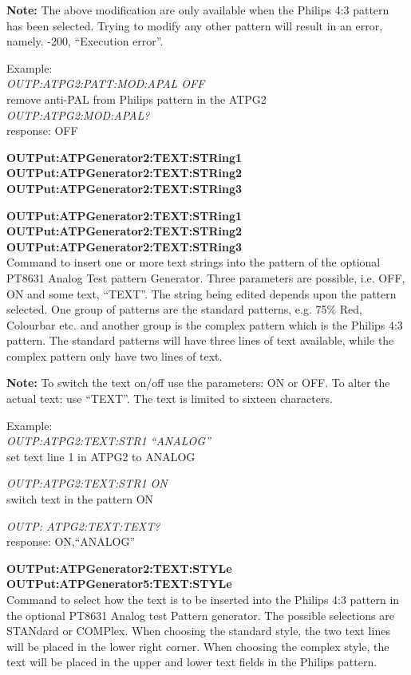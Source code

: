 \textbf{Note:} The above modification are only available when the Philips 4:3 pattern has been selected. Trying to modify any other pattern will result in an error, namely. -200, ``Execution error''.

Example:\\
\textit{OUTP:ATPG2:PATT:MOD:APAL OFF}\\
remove anti-PAL from Philips pattern in the ATPG2\\
\textit{OUTP:ATPG2:MOD:APAL?}\\
response: OFF

\textbf{OUTPut:ATPGenerator2:TEXT:STRing1}\\
\textbf{OUTPut:ATPGenerator2:TEXT:STRing2}\\
\textbf{OUTPut:ATPGenerator2:TEXT:STRing3}

\textbf{OUTPut:ATPGenerator2:TEXT:STRing1}\\
\textbf{OUTPut:ATPGenerator2:TEXT:STRing2}\\
\textbf{OUTPut:ATPGenerator2:TEXT:STRing3}\\
Command to insert one or more text strings into the pattern of the optional PT8631 Analog Test pattern Generator. Three parameters are possible, i.e. OFF, ON and some text, ``TEXT''. The string being edited depends upon the pattern selected. One group of patterns are the
standard patterns, e.g. 75\% Red, Colourbar etc. and another group is the complex pattern which is the Philips 4:3 pattern. The standard patterns will have three lines of text available, while the complex pattern only have two lines of text.

\textbf{Note:} To switch the text on/off use the parameters: ON or OFF. To alter the actual text: use ``TEXT''. The text is limited to sixteen characters. %

Example:\\
\textit{OUTP:ATPG2:TEXT:STR1 ``ANALOG''}\\
set text line 1 in ATPG2 to ANALOG

\textit{OUTP:ATPG2:TEXT:STR1 ON}\\
switch text in the pattern ON

\textit{OUTP: ATPG2:TEXT:TEXT?}\\
response: ON,``ANALOG''

\textbf{OUTPut:ATPGenerator2:TEXT:STYLe}\\
\textbf{OUTPut:ATPGenerator5:TEXT:STYLe}\\
Command to select how the text is to be inserted into the Philips 4:3 pattern in the optional PT8631 Analog test Pattern generator. The possible selections are STANdard or COMPlex. When choosing the standard style, the two text lines will be placed in the lower right corner.
When choosing the complex style, the text will be placed in the upper and lower text fields in the Philips pattern.

